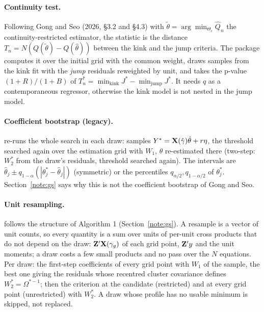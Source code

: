\documentclass[
  10.5pt,
  a4paper,
]{article}
\begin{document}
\paragraph{Continuity test.} Following Gong and Seo (2026, \S3.2 and \S4.3) with
$\tilde\theta=\arg\min_{\Theta_c}\hat Q_n$ the continuity-restricted estimator, the statistic is the
distance $T_n=N(Q(\tilde\theta)-Q(\hat\theta))$ between the kink and the jump criteria. The package computes
it over the initial grid with the common weight, draws samples from the kink fit with the \emph{jump}
residuals reweighted by unit, and takes the p-value $(1+R)/(1+B)$ of $T^*_n=\min_{\text{kink}}J^*-\min_{\text{jump}}J^*$.
It needs $q$ as a contemporaneous regressor, otherwise the kink model is not nested in the jump model.

\paragraph{Coefficient bootstrap (legacy).}  re-runs the whole search in each draw: samples
$Y^*=\mathbf{X}(\hat\gamma)\hat\theta+r\eta$, the threshold searched again over the estimation grid with $W_1$, $\theta$
re-estimated there (two-step: $W_2^*$ from the draw's residuals, threshold searched again). The intervals are
$\hat\theta_j\pm q_{1-\alpha}(|\theta^*_j-\hat\theta_j|)$ (symmetric) or the percentiles
$q_{\alpha/2},q_{1-\alpha/2}$ of $\theta^*_j$. Section~\ref{note:gs} says why this is not the coefficient
bootstrap of Gong and Seo.

\paragraph{Unit resampling.}  follows the structure of Algorithm 1
(Section~\ref{note:gs}). A resample is a vector of unit counts, so every quantity is a sum over units of
per-unit cross products that do not depend on the draw: $\mathbf{Z}'\mathbf{X}(\gamma_g)$ of each grid point, $\mathbf{Z}'y$ and the
unit moments; a draw costs a few small products and no pass over the $N$ equations. Per draw: the
first-step coefficients of every grid point with $W_1$ of the sample, the best one giving the residuals whose
recentred cluster covariance defines $W_2^*=\Omega^{*-1}$; then the criterion at the candidate (restricted)
and at every grid point (unrestricted) with $W_2^*$. A draw whose profile has no usable minimum is skipped,
not replaced.
\end{document}
